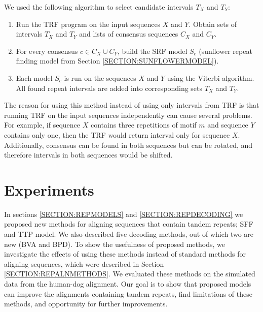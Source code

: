 We used the following algorithm to select candidate intervals $T_X$ and $T_Y$:
\begin{enumerate}[itemsep=-1mm]
\item Run the TRF program on the input sequences $X$ and $Y$. Obtain sets of
intervals $T_X$ and $T_Y$ and lists of consensus sequences $C_X$ and $C_Y$.

\item For every consensus $c\in C_X\cup C_Y$, build the SRF model $S_c$
(sunflower repeat finding model from Section \ref{SECTION:SUNFLOWERMODEL}). 

\item Each model $S_c$ is run on the sequences $X$ and $Y$ using the Viterbi
algorithm. All found repeat intervals are added into corresponding sets $T_X$
and $T_Y$.

\end{enumerate}
The reason for using this method instead of using only intervals from TRF is
that running TRF on the input sequences independently can cause several
problems. For example, if sequence $X$ contains three repetitions of motif $m$
and sequence $Y$ contains only one, then the TRF would return interval only for
sequence $X$. Additionally, consensus can be found in both sequences but can be
rotated, and therefore intervals in both sequences would be shifted.


\section{Experiments}
In sections \ref{SECTION:REPMODELS} and \ref{SECTION:REPDECODING} we proposed
new methods for aligning sequences that contain tandem repeats; SFF and TTP
model.  We also described five decoding methods, out of which two are new (BVA
and BPD). To show the usefulness of proposed methods, we investigate the
effects of using these methods instead of standard methods for aligning
sequences, which were described in Section \ref{SECTION:REPALNMETHODS}. We 
evaluated these methods on the simulated data from the human-dog alignment. Our
goal is to show that proposed models can improve the alignments containing
tandem repeats, find limitations of these methods, and opportunity for further
improvements.

